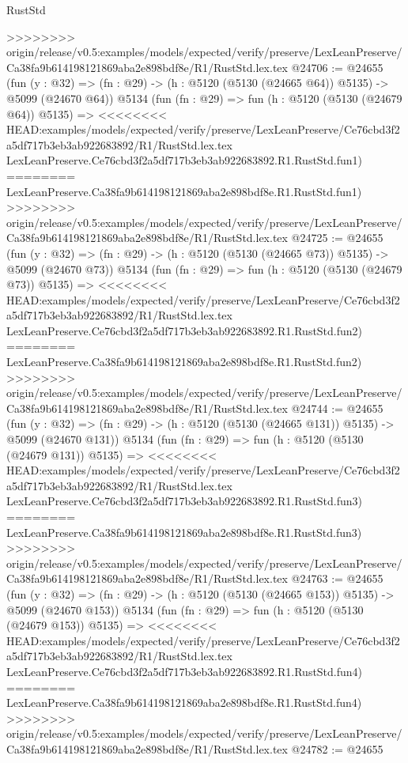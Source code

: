 \begin{lexlean}{RustStd}
\begin{coremodule}
{\begin{coremodule}
{{{{{{{{{{{{{{{{{{{{{{{{{{{{{{{>>>>>>>> origin/release/v0.5:examples/models/expected/verify/preserve/LexLeanPreserve/Ca38fa9b614198121869aba2e898bdf8e/R1/RustStd.lex.tex
@24706 := @24655
    (fun (y : @32) => (fn : @29) -> (h : @5120 (@5130 (@24665 @64)) @5135) -> @5099 (@24670 @64))
    @5134
    (fun (fn : @29) =>
    fun (h : @5120 (@5130 (@24679 @64)) @5135) =>
<<<<<<<< HEAD:examples/models/expected/verify/preserve/LexLeanPreserve/Ce76cbd3f2a5df717b3eb3ab922683892/R1/RustStd.lex.tex
    LexLeanPreserve.Ce76cbd3f2a5df717b3eb3ab922683892.R1.RustStd.fun1)
========
    LexLeanPreserve.Ca38fa9b614198121869aba2e898bdf8e.R1.RustStd.fun1)
>>>>>>>> origin/release/v0.5:examples/models/expected/verify/preserve/LexLeanPreserve/Ca38fa9b614198121869aba2e898bdf8e/R1/RustStd.lex.tex
@24725 := @24655
    (fun (y : @32) => (fn : @29) -> (h : @5120 (@5130 (@24665 @73)) @5135) -> @5099 (@24670 @73))
    @5134
    (fun (fn : @29) =>
    fun (h : @5120 (@5130 (@24679 @73)) @5135) =>
<<<<<<<< HEAD:examples/models/expected/verify/preserve/LexLeanPreserve/Ce76cbd3f2a5df717b3eb3ab922683892/R1/RustStd.lex.tex
    LexLeanPreserve.Ce76cbd3f2a5df717b3eb3ab922683892.R1.RustStd.fun2)
========
    LexLeanPreserve.Ca38fa9b614198121869aba2e898bdf8e.R1.RustStd.fun2)
>>>>>>>> origin/release/v0.5:examples/models/expected/verify/preserve/LexLeanPreserve/Ca38fa9b614198121869aba2e898bdf8e/R1/RustStd.lex.tex
@24744 := @24655
    (fun (y : @32) => (fn : @29) -> (h : @5120 (@5130 (@24665 @131)) @5135) -> @5099 (@24670 @131))
    @5134
    (fun (fn : @29) =>
    fun (h : @5120 (@5130 (@24679 @131)) @5135) =>
<<<<<<<< HEAD:examples/models/expected/verify/preserve/LexLeanPreserve/Ce76cbd3f2a5df717b3eb3ab922683892/R1/RustStd.lex.tex
    LexLeanPreserve.Ce76cbd3f2a5df717b3eb3ab922683892.R1.RustStd.fun3)
========
    LexLeanPreserve.Ca38fa9b614198121869aba2e898bdf8e.R1.RustStd.fun3)
>>>>>>>> origin/release/v0.5:examples/models/expected/verify/preserve/LexLeanPreserve/Ca38fa9b614198121869aba2e898bdf8e/R1/RustStd.lex.tex
@24763 := @24655
    (fun (y : @32) => (fn : @29) -> (h : @5120 (@5130 (@24665 @153)) @5135) -> @5099 (@24670 @153))
    @5134
    (fun (fn : @29) =>
    fun (h : @5120 (@5130 (@24679 @153)) @5135) =>
<<<<<<<< HEAD:examples/models/expected/verify/preserve/LexLeanPreserve/Ce76cbd3f2a5df717b3eb3ab922683892/R1/RustStd.lex.tex
    LexLeanPreserve.Ce76cbd3f2a5df717b3eb3ab922683892.R1.RustStd.fun4)
========
    LexLeanPreserve.Ca38fa9b614198121869aba2e898bdf8e.R1.RustStd.fun4)
>>>>>>>> origin/release/v0.5:examples/models/expected/verify/preserve/LexLeanPreserve/Ca38fa9b614198121869aba2e898bdf8e/R1/RustStd.lex.tex
@24782 := @24655
}}}}}}}}}}}}}}}}}}}}}}}}}}}}}}}
\end{coremodule}}
\end{coremodule}
\end{lexlean}
